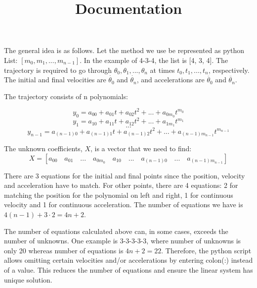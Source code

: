 \documentclass[a4paper]{article}
\title{Documentation}
\date{}
\begin{document}
  \maketitle

  	The general idea is as follows. Let the method we use be represented as python List: $[m_{0}, m_{1}, ... , m_{n-1}]$. In the example of 4-3-4, the list is [4, 3, 4]. The trajectory is required to go through $\theta_{0}, \theta_{1}, ..., \theta_{n}$ at times $t_{0}, t_{1}, ... , t_{n}$, respectively. The initial and final velocities are $\dot{\theta_{0}}$ and $\dot{\theta_{n}}$, and accelerations are $\ddot{\theta_{0}}$ and $\ddot{\theta_{n}}$.
  	
  	The trajectory consists of n polynomials:
  	
  	\begin{equation*}
	  	y_{0}=a_{00}+a_{01}t+a_{02}t^{2}+...+a_{0m_{0}}t^{m_{0}}
	\end{equation*}
	\begin{equation*}
	  	y_{1}=a_{10}+a_{11}t+a_{12}t^{2}+...+a_{1m_{1}}t^{m_{1}}
	\end{equation*}
	\begin{equation*}
		...
	\end{equation*}
  	\begin{equation*}
  		y_{n-1}=a_{(n-1)0}+a_{(n-1)1}t+a_{(n-1)2}t^{2}+...+a_{(n-1)m_{n-1}}t^{m_{n-1}}
  	\end{equation*}
  	
  	The unknown coefficients, $X$, is a vector that we need to find:
  	\begin{equation*}
	  	X=[a_{00} \quad a_{01} \quad ... \quad a_{0m_{0}} \quad a_{10} \quad ... \quad a_{(n-1)0} \quad ... \quad a_{(n-1)m_{n-1}}]
  	\end{equation*}
  	
  	There are 3 equations for the initial and final points since the position, velocity and acceleration have to match. For other points, there are 4 equations: 2 for matching the position for the polynomial on left and right, 1 for continuous velocity and 1 for continuous acceleration. The number of equations we have is $4(n-1)+3 \cdot 2=4n+2$.
  	
  	The number of equations calculated above can, in some cases, exceeds the number of unknowns. One example is 3-3-3-3-3, where number of unknowns is only 20 whereas number of equations is $4n+2=22$. Therefore, the python script allows omitting certain velocities and/or accelerations by entering colon(:) instead of a value. This reduces the number of equations and ensure the linear system has unique solution.
  	
\end{document}
